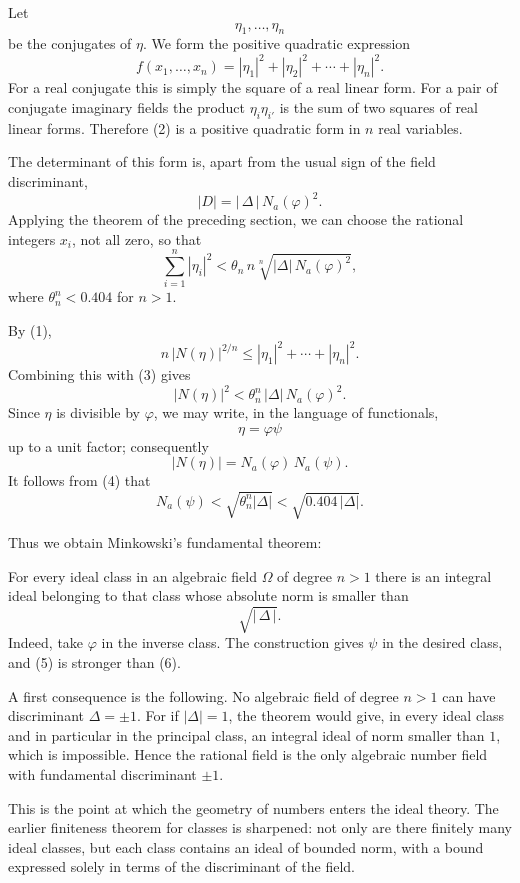 \documentclass[12pt,a4paper]{article}
\begin{document}
Let
\[
  \eta_1,\ldots,\eta_n
\]
be the conjugates of \(\eta\).  We form the positive quadratic expression
\[
  f(x_1,\ldots,x_n)=|\eta_1|^2+|\eta_2|^2+\cdots+|\eta_n|^2.
\tag{2}
\]
For a real conjugate this is simply the square of a real linear form.  For a pair of conjugate imaginary fields the product \(\eta_i\eta_{i'}\) is the sum of two squares of real linear forms.  Therefore (2) is a positive quadratic form in \(n\) real variables.

The determinant of this form is, apart from the usual sign of the field discriminant,
\[
  |D|=|\,\Delta\,|\,N_a(\varphi)^2.
\]
Applying the theorem of the preceding section, we can choose the rational integers \(x_i\), not all zero, so that
\[
  \sum_{i=1}^{n}|\eta_i|^2
    <\theta_n\,n\sqrt[n]{|\Delta|\,N_a(\varphi)^2},
\tag{3}
\]
where \(\theta_n^n<0.404\) for \(n>1\).

By (1),
\[
  n\,|N(\eta)|^{2/n}
     \le |\eta_1|^2+\cdots+|\eta_n|^2.
\]
Combining this with (3) gives
\[
  |N(\eta)|^2
    <\theta_n^n\,|\Delta|\,N_a(\varphi)^2.
\tag{4}
\]
Since \(\eta\) is divisible by \(\varphi\), we may write, in the language of functionals,
\[
  \eta=\varphi\psi
\]
up to a unit factor; consequently
\[
  |N(\eta)|=N_a(\varphi)\,N_a(\psi).
\]
It follows from (4) that
\[
  N_a(\psi)<\sqrt{\theta_n^n|\Delta|}<\sqrt{0.404\,|\Delta|}.
\tag{5}
\]

Thus we obtain Minkowski's fundamental theorem:

For every ideal class in an algebraic field \(\Omega\) of degree \(n>1\) there is an integral ideal belonging to that class whose absolute norm is smaller than
\[
  \sqrt{|\,\Delta\,|}.
\tag{6}
\]
Indeed, take \(\varphi\) in the inverse class.  The construction gives \(\psi\) in the desired class, and (5) is stronger than (6).

A first consequence is the following.  No algebraic field of degree \(n>1\) can have discriminant \(\Delta=\pm1\).  For if \(|\Delta|=1\), the theorem would give, in every ideal class and in particular in the principal class, an integral ideal of norm smaller than \(1\), which is impossible.  Hence the rational field is the only algebraic number field with fundamental discriminant \(\pm1\).

This is the point at which the geometry of numbers enters the ideal theory.  The earlier finiteness theorem for classes is sharpened: not only are there finitely many ideal classes, but each class contains an ideal of bounded norm, with a bound expressed solely in terms of the discriminant of the field.
\end{document}
